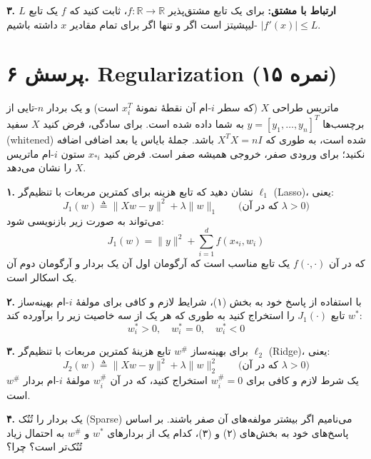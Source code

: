 \textbf{۳. ارتباط با مشتق:}
برای یک تابع مشتق‌پذیر $f : \mathbb{R} \to \mathbb{R}$، ثابت کنید که $f$ یک تابع $L$-لیپشیتز است اگر و تنها اگر برای تمام مقادیر $x$ داشته باشیم $|f'(x)| \le L$.

\vspace{1cm}

\section*{پرسش ۶. Regularization (۱۵ نمره)}

ماتریس طراحی $X$ (که سطر $i$-ام آن نقطهٔ نمونهٔ $x_i^T$ است) و یک بردار $n$-تایی از برچسب‌ها $y = [y_1, \dots, y_n]^T$ به شما داده شده است. برای سادگی، فرض کنید $X$ سفید (whitened) شده است، به طوری که $X^T X = nI$ باشد. جملهٔ بایاس یا بعد اضافی اضافه نکنید؛ برای ورودی صفر، خروجی همیشه صفر است. فرض کنید $x_{*i}$ ستون $i$-ام ماتریس $X$ را نشان می‌دهد.

\textbf{۱.} نشان دهید که تابع هزینه برای کمترین مربعات با تنظیم‌گر $\ell_1$ (Lasso)، یعنی:
\begin{equation*}
J_1(w) \triangleq \|Xw - y\|^2 + \lambda \|w\|_1 \quad \quad \text{(که در آن $\lambda > 0$)}
\end{equation*}
می‌تواند به صورت زیر بازنویسی شود:
\begin{equation*}
J_1(w) = \|y\|^2 + \sum_{i=1}^d f(x_{*i}, w_i)
\end{equation*}
که در آن $f(\cdot, \cdot)$ یک تابع مناسب است که آرگومان اول آن یک بردار و آرگومان دوم آن یک اسکالر است.

\textbf{۲.} با استفاده از پاسخ خود به بخش (۱)، شرایط لازم و کافی برای مولفهٔ $i$-ام بهینه‌ساز $w^*$ تابع $J_1(\cdot)$ را استخراج کنید به طوری که هر یک از سه خاصیت زیر را برآورده کند:
\begin{equation*}
w_i^* > 0, \quad w_i^* = 0, \quad w_i^* < 0
\end{equation*}

\textbf{۳.} برای بهینه‌ساز $w^\#$ تابع هزینهٔ کمترین مربعات با تنظیم‌گر $\ell_2$ (Ridge)، یعنی:
\begin{equation*}
J_2(w) \triangleq \|Xw - y\|^2 + \lambda \|w\|_2^2 \quad \quad \text{(که در آن $\lambda > 0$)}
\end{equation*}
یک شرط لازم و کافی برای $w_i^\# = 0$ استخراج کنید، که در آن $w_i^\#$ مولفهٔ $i$-ام بردار $w^\#$ است.

\textbf{۴.} یک بردار را تُنُک (Sparse) می‌نامیم اگر بیشتر مولفه‌های آن صفر باشند. بر اساس پاسخ‌های خود به بخش‌های (۲) و (۳)، کدام یک از بردارهای $w^*$ و $w^\#$ به احتمال زیاد تُنُک‌تر است؟ چرا؟